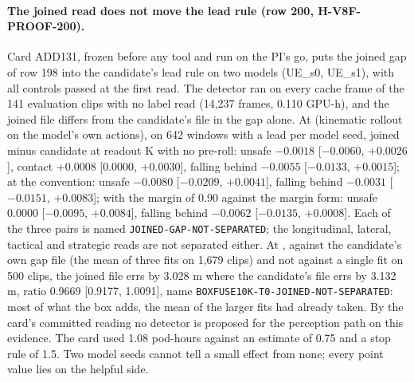 \paragraph{The joined read does not move the lead rule (row 200, H-V8F-PROOF-200).} Card ADD131, frozen before any tool and run on the PI's go, puts the joined gap of row 198 into the candidate's lead rule on two models (UE\_s0, UE\_s1), with all controls passed at the first read. The detector ran on every cache frame of the 141 evaluation clips with no label read (14,237 frames, 0.110 GPU-h), and the joined file differs from the candidate's file in the gap alone. At  (kinematic rollout on the model's own actions), on 642 windows with a lead per model seed, joined minus candidate at readout K with no pre-roll: unsafe $-0.0018$ [$-0.0060$, $+0.0026$], contact $+0.0008$ [0.0000, $+0.0030$], falling behind $-0.0055$ [$-0.0133$, $+0.0015$]; at the convention: unsafe $-0.0080$ [$-0.0209$, $+0.0041$], falling behind $-0.0031$ [$-0.0151$, $+0.0083$]; with the margin of 0.90 against the margin form: unsafe 0.0000 [$-0.0095$, $+0.0084$], falling behind $-0.0062$ [$-0.0135$, $+0.0008$]. Each of the three pairs is named \texttt{JOINED-GAP-NOT-SEPARATED}; the longitudinal, lateral, tactical and strategic reads are not separated either. At , against the candidate's own gap file (the mean of three fits on 1,679 clips) and not against a single fit on 500 clips, the joined file errs by 3.028 m where the candidate's file errs by 3.132 m, ratio 0.9669 [0.9177, 1.0091], name \texttt{BOXFUSE10K-T0-JOINED-NOT-SEPARATED}: most of what the box adds, the mean of the larger fits had already taken. By the card's committed reading no detector is proposed for the perception path on this evidence. The card used 1.08 pod-hours against an estimate of 0.75 and a stop rule of 1.5. Two model seeds cannot tell a small effect from none; every point value lies on the helpful side.

